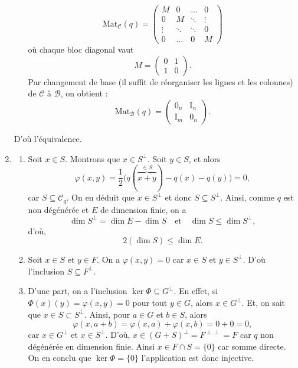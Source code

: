 \documentclass{../../td}
\begin{document}
\begin{enumerate}
\begin{itemize}
          \[
            \mathrm{Mat}_\mathcal{C}(q) = \begin{pmatrix} 
              M & 0 & \ldots & 0\\
              0 & M & \ddots & \vdots \\
              \vdots & \ddots & \ddots & 0\\
              0 & \ldots & 0 & M
            \end{pmatrix}
          \] 
          où chaque bloc diagonal vaut \[
            M = \begin{pmatrix} 0 & 1\\ 1 & 0 \end{pmatrix} 
          .\]
          Par changement de base (il suffit de réorganiser les lignes et les colonnes) de $\mathcal{C}$ à $\mathcal{B}$, on obtient :
          \[
            \mathrm{Mat}_\mathcal{B}(q) = \begin{pmatrix} 0_n & \mathrm{I}_n \\ \mathrm{I}_m & 0_n \end{pmatrix} 
          .\]
      \end{itemize}
      D'où l'équivalence.
    \item\label{ex3-q3}
      \begin{enumerate}
        \item Soit $x \in S$. Montrons que $x \in S^\perp$. \label{ex3-q3a}
          Soit $y \in S$, et alors \[
          \varphi(x,y) = \frac{1}{2}\big(q(\overbrace{x+y}^{\in S}) - q(x) - q(y)\big) = 0
          ,\] car $S \subseteq \mathcal{C}_q$.
          On en déduit que $x \in S^\perp$ et donc $S \subseteq S^\perp$.
          Ainsi, comme $q$ est non dégénérée et $E$ de dimension finie, on a \[
          \dim S^\perp = \dim E - \dim S \quad \text{et}\quad \dim S \le \dim S^\perp
          ,\] d'où, \[
          2(\dim S) \le \dim E
          .\]
        \item Soit $x \in S$ et $y \in F$. On a $\varphi(x, y) = 0$ car $x \in S$ et $y \in S^\perp$.
          D'où l'inclusion $S \subseteq F^\perp$.
        \item D'une part, on a l'inclusion $\ker \Phi \subseteq G^\perp$.
          En effet, si $\Phi(x)(y) = \varphi(x,y) = 0$ pour tout $y \in G$, alors $x \in G^\perp$.
          Et, on sait que $x \in S \subset S^\perp$.
          Ainsi, pour $a \in G$ et $b \in S$, alors  \[
          \varphi(x, a + b) = \varphi(x, a) + \varphi(x, b) = 0 + 0 = 0
          ,\] car $x \in G^\perp$ et $x \in S^\perp$.
          D'où, $x \in (G + S)^\perp = F^{\perp \perp} = F$ car $q$ non dégénérée en dimension finie.
          Ainsi $x \in F \cap S = \{0\}$ car somme directe.
          On en conclu que $\ker \Phi = \{0\}$ l'application est donc injective.


\end{enumerate}
\end{enumerate}
\end{document}
